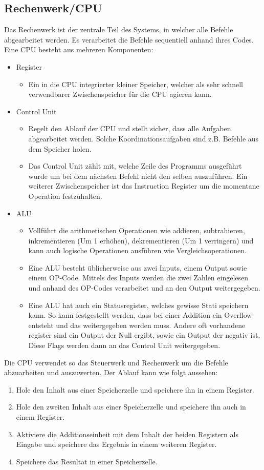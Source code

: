 \documentclass{article}
\begin{document}
		\subsection{Rechenwerk/CPU}
		Das Rechenwerk ist der zentrale Teil des Systems, in welcher alle Befehle abgearbeitet werden. Es verarbeitet die Befehle sequentiell anhand ihres Codes. Eine CPU besteht aus mehreren Komponenten:
		\begin{itemize}
			\item{Register}
			\begin{itemize}
				\item{Ein in die CPU integrierter kleiner Speicher, welcher als sehr schnell verwendbarer Zwischenspeicher für die CPU agieren kann.}
			\end{itemize}
			\item{Control Unit}
			\begin{itemize}
				\item{Regelt den Ablauf der CPU und stellt sicher, dass alle Aufgaben abgearbeitet werden. Solche Koordinationsaufgaben sind z.B. Befehle aus dem Speicher holen.}
				\item{Das Control Unit zählt mit, welche Zeile des Programms ausgeführt wurde um bei dem nächsten Befehl nicht den selben auszuführen. Ein weiterer Zwischenspeicher ist das Instruction Register um die momentane Operation festzuhalten.}
			\end{itemize}
			\item{ALU}
			\begin{itemize}
				\item{Vollführt die arithmetischen Operationen wie addieren, subtrahieren, inkrementieren (Um 1 erhöhen), dekrementieren (Um 1 verringern) und kann auch logische Operationen ausführen wie Vergleichsoperationen.}
				\item{Eine ALU besteht üblicherweise aus zwei Inputs, einem Output sowie einem OP-Code. Mittels des Inputs werden die zwei Zahlen eingelesen und anhand des OP-Codes verarbeitet und an den Output weitergegeben.}
				\item{Eine ALU hat auch ein Statusregister, welches gewisse Stati speichern kann. So kann festgestellt werden, dass bei einer Addition ein Overflow entsteht und das weitergegeben werden muss. Andere oft vorhandene register sind ein Output der Null ergibt, sowie ein Output der negativ ist. Diese Flags werden dann an das Control Unit weitergegeben.}
			\end{itemize}
		\end{itemize}
		Die CPU verwendet so das Steuerwerk und Rechenwerk um die Befehle abzuarbeiten und auszuwerten. Der Ablauf kann wie folgt aussehen: 
		\begin{enumerate}
			\item{Hole den Inhalt aus einer Speicherzelle und speichere ihn in einem Register.}
			\item{Hole den zweiten Inhalt aus einer Speicherzelle und speichere ihn auch in einem Register.}
			\item{Aktiviere die Additionseinheit mit dem Inhalt der beiden Registern als Eingabe und speichere das Ergebnis in einem weiteren Register.}
			\item{Speichere das Resultat in einer Speicherzelle.}
		\end{enumerate}
\end{document}
